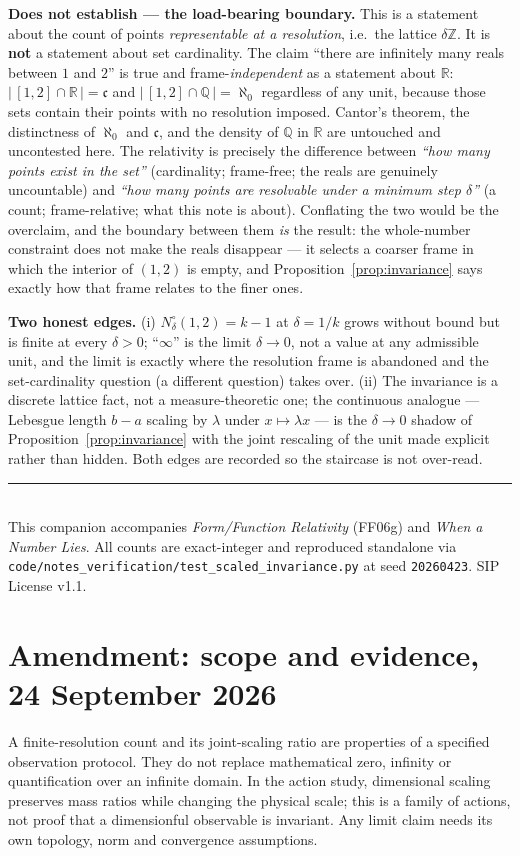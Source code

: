 \documentclass[11pt]{article}
\theoremstyle{definition}
\theoremstyle{plain}
\newcommand{\Z}{\mathbb{Z}}
\newcommand{\R}{\mathbb{R}}
\newcommand{\Q}{\mathbb{Q}}
\begin{document}
\textbf{Does not establish --- the load-bearing boundary.} This is a statement about the count of
points \emph{representable at a resolution}, i.e.\ the lattice $\delta\Z$. It is \textbf{not} a statement
about set cardinality. The claim ``there are infinitely many reals between $1$ and $2$'' is true and
frame-\emph{independent} as a statement about $\R$: $|\,[1,2]\cap\R\,|=\mathfrak{c}$ and
$|\,[1,2]\cap\Q\,|=\aleph_0$ regardless of any unit, because those sets contain their points with no
resolution imposed. Cantor's theorem, the distinctness of $\aleph_0$ and $\mathfrak c$, and the density
of $\Q$ in $\R$ are untouched and uncontested here. The relativity is precisely the difference between
\emph{``how many points exist in the set''} (cardinality; frame-free; the reals are genuinely
uncountable) and \emph{``how many points are resolvable under a minimum step $\delta$''} (a count;
frame-relative; what this note is about). Conflating the two would be the overclaim, and the boundary
between them \emph{is} the result: the whole-number constraint does not make the reals disappear --- it
selects a coarser frame in which the interior of $(1,2)$ is empty, and Proposition~\ref{prop:invariance}
says exactly how that frame relates to the finer ones.

\textbf{Two honest edges.} (i) $N_\delta^{\circ}(1,2)=k-1$ at $\delta=1/k$ grows without bound but is
finite at every $\delta>0$; ``$\infty$'' is the limit $\delta\to0$, not a value at any admissible unit,
and the limit is exactly where the resolution frame is abandoned and the set-cardinality question (a
different question) takes over. (ii) The invariance is a discrete lattice fact, not a measure-theoretic
one; the continuous analogue --- Lebesgue length $b-a$ scaling by $\lambda$ under $x\mapsto\lambda x$ ---
is the $\delta\to0$ shadow of Proposition~\ref{prop:invariance} with the joint rescaling of the unit
made explicit rather than hidden. Both edges are recorded so the staircase is not over-read.

\vspace{1em}
\noindent\rule{\linewidth}{0.4pt}\\
\small This companion accompanies \textit{Form/Function Relativity} (FF06g) and \textit{When a Number
Lies}. All counts are exact-integer and reproduced standalone via
\nolinkurl{code/notes_verification/test_scaled_invariance.py} at seed \texttt{20260423}. SIP License v1.1.


\section*{Amendment: scope and evidence, 24 September 2026}
A finite-resolution count and its joint-scaling ratio are properties of a specified observation protocol. They do not replace mathematical zero, infinity or quantification over an infinite domain. In the action study, dimensional scaling preserves mass ratios while changing the physical scale; this is a family of actions, not proof that a dimensionful observable is invariant. Any limit claim needs its own topology, norm and convergence assumptions.
\end{document}

